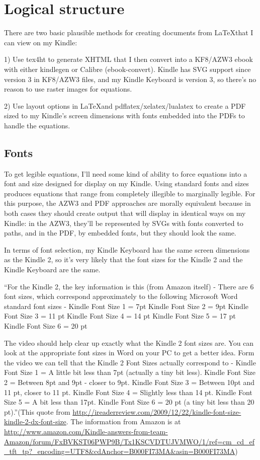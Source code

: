\documentclass[12pt]{article}
\begin{document}

\section{Logical structure}
\label{sec:logical_structure}

There are two basic plausible methods for creating documents from
\LaTeX that I can view on my Kindle:

1) Use tex4ht to generate XHTML that I then convert into a KF8/AZW3
ebook with either kindlegen or Calibre (ebook-convert).  Kindle has
SVG support since version 3 in KF8/AZW3 files, and my Kindle Keyboard
is version 3, so there's no reason to use raster images for equations.

2) Use layout options in \LaTeX and pdflatex/xelatex/lualatex to create
a PDF sized to my Kindle's screen dimensions with fonts embedded into
the PDFs to handle the equations.


\subsection{Fonts}
\label{sec:fonts}

To get legible equations, I'll need some kind of ability to force
equations into a font and size designed for display on my Kindle.
Using standard fonts and sizes produces equations that range from
completely illegible to marginally legible.  For this purpose, the
AZW3 and PDF approaches are morally equivalent because in both cases
they should create output that will display in identical ways on my
Kindle: in the AZW3, they'll be represented by SVGs with fonts
converted to paths, and in the PDF, by embedded fonts, but they should
look the same.

In terms of font selection, my Kindle Keyboard has the same screen
dimensions as the Kindle 2, so it's very likely that the font sizes
for the Kindle 2 and the Kindle Keyboard are the same.

``For the Kindle 2, the key information is this (from Amazon itself) -
There are 6 font sizes, which correspond approximately to the following Microsoft Word standard font sizes -
Kindle Font Size 1 = 7pt
Kindle Font Size 2 = 9pt
Kindle Font Size 3 = 11 pt
Kindle Font Size 4 = 14 pt
Kindle Font Size 5 = 17 pt
Kindle Font Size 6 = 20 pt

The video should help clear up exactly what the Kindle 2 font sizes are. You can look at the appropriate font sizes in Word on your PC to get a better idea.
Form the video we can tell that the Kindle 2 Font Sizes actually correspond to -
Kindle Font Size 1 = A little bit less than 7pt (actually a tiny bit less).
Kindle Font Size 2 = Between 8pt and 9pt - closer to 9pt.
Kindle Font Size 3 = Between 10pt and 11 pt, closer to 11 pt.
Kindle Font Size 4 = Slightly less than 14 pt.
Kindle Font Size 5 = A bit less than 17pt.
Kindle Font Size 6 = 20 pt (a tiny bit less than 20 pt).''(This quote
from
\url{http://ireaderreview.com/2009/12/22/kindle-font-size-kindle-2-dx-font-size}.  The information from Amazon is at
\url{http://www.amazon.com/Kindle-answers-from-team-Amazon/forum/FxBVKST06PWP9B/Tx1KSCVDTUJVMWO/1/ref=cm_cd_ef_tft_tp?_encoding=UTF8&cdAnchor=B000FI73MA&asin=B000FI73MA})
\end{document}
